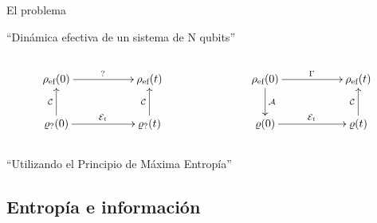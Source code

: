 \begin{frame}{El problema}
    \begin{center}
        ``Dinámica efectiva de un sistema de N qubits''
    \end{center}
    \begin{columns}
        \begin{column}{0.5\textwidth}
            \begin{displaymath}
                \xymatrix{
                  {\rho_{\ef}(0)} \ar[rr]^{\text{?}}
                  && {\rho_{\ef}(t)}\\
                  {\varrho_{\text{?}}(0)} \ar[rr]^{\mcE_{t}} \ar[u]^{\mcC}
                  && {\varrho_{\text{?}}(t)} \ar[u]^{\mcC}
                }
              \end{displaymath}
        \end{column}
        \pause
        \begin{column}{0.5\textwidth}
            \begin{displaymath}
                \xymatrix{
                  {\rho_{\ef}(0)} \ar[rr]^{\Gamma} \ar[d]^{\mcA}
                  && {\rho_{\ef}(t)}\\
                  {\varrho(0)} \ar[rr]^{\mcE_{t}}
                  && {\varrho(t)} \ar[u]^{\mcC}
                }
              \end{displaymath}
              \pause
        \end{column}
    \end{columns}
    \begin{center}
        ``Utilizando el Principio de Máxima Entropía''
    \end{center}
\end{frame}

\subsection{Entropía e información}

